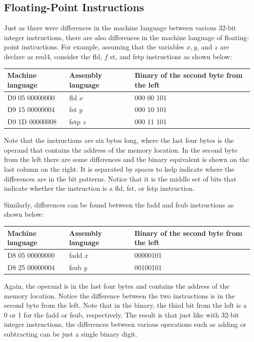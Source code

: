 \documentclass[10pt]{book}
\begin{document}
\subsection{Floating-Point Instructions}
Just as there were differences in the machine language between various 32-bit integer instructions, there are also differences in the machine language of floating-point instructions. For example, assuming that the variables $x, y$, and $z$ are declare as real4, consider the fld, $f$ st, and fstp instructions as shown below:
\begin{center}
\begin{tabular}{|l|l|l|}
\hline
Machine language & Assembly language & Binary of the second byte from the left \\
\hline
D9 05 00000000 & fld $x$ & 000 00 101 \\
\hline
D9 15 00000004 & fst $y$ & 000 10 101 \\
\hline
D9 1D 00000008 & fstp $z$ & 000 11 101 \\
\hline
\end{tabular}
\end{center}

Note that the instructions are six bytes long, where the last four bytes is the operand that contains the address of the memory location. In the second byte from the left there are some differences and the binary equivalent is shown on the last column on the right. It is separated by spaces to help indicate where the differences are in the bit patterns. Notice that it is the middle set of bits that indicate whether the instruction is a fld, fst, or fstp instruction.

Similarly, differences can be found between the fadd and fsub instructions as shown below:

\begin{center}
\begin{tabular}{|l|l|l|}
\hline
Machine language & Assembly language & Binary of the second byte from the left \\
\hline
D8 05 00000000 & fadd $x$ & 00000101 \\
\hline
D8 25 00000004 & fsub $y$ & 00100101 \\
\hline
\end{tabular}
\end{center}

Again, the operand is in the last four bytes and contains the address of the memory location. Notice the difference between the two instructions is in the second byte from the left. Note that in the binary, the third bit from the left is a 0 or 1 for the fadd or fsub, respectively. The result is that just like with 32-bit integer instructions, the differences between various operations such as adding or subtracting can be just a single binary digit.
\end{document}
